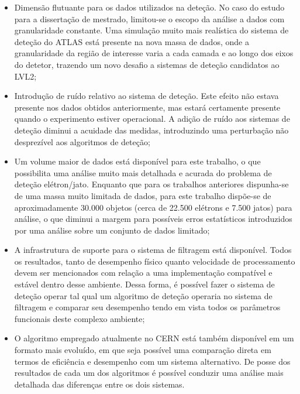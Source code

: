 \begin{itemize}
\item Dimensão flutuante para os dados utilizados na deteção. No caso do
estudo para a dissertação de mestrado, limitou-se o escopo da análise a dados
com granularidade constante. Uma simulação muito mais realística do sistema de
deteção do ATLAS está presente na nova massa de dados, onde a granularidade da
região de interesse varia a cada camada e ao longo dos eixos do detetor,
trazendo um novo desafio a sistemas de deteção candidatos ao LVL2;

\item Introdução de ruído relativo ao sistema de deteção. Este efeito não
estava presente nos dados obtidos anteriormente, mas estará certamente
presente quando o experimento estiver operacional. A adição de ruído aos
sistemas de deteção diminui a acuidade das medidas, introduzindo uma
perturbação não desprezível aos algoritmos de deteção;

\item Um volume maior de dados está disponível para este trabalho, o que
possibilita uma análise muito mais detalhada e acurada do problema de deteção
elétron/jato. Enquanto que para os trabalhos anteriores dispunha-se de uma
massa muito limitada de dados, para este trabalho dispõe-se de aproximadamente
30.000 objetos (cerca de 22.500 elétrons e 7.500 jatos) para análise, o que
diminui a margem para possíveis erros estatísticos introduzidos por uma
análise sobre um conjunto de dados limitado;

\item A infrastrutura de suporte para o sistema de filtragem está
disponível. Todos os resultados, tanto de desempenho físico quanto velocidade
de processamento devem ser mencionados com relação a uma implementação
compatível e estável dentro desse ambiente. Dessa forma, é possível fazer o
sistema de deteção operar tal qual um algoritmo de deteção operaria no sistema
de filtragem e comparar seu desempenho tendo em vista todos os parâmetros
funcionais deste complexo ambiente;

\item O algoritmo empregado atualmente no CERN está também disponível em um
formato mais evoluído, em que seja possível uma comparação direta em termos de
eficiência e desempenho com um sistema alternativo. De posse dos resultados de
cada um dos algoritmos é possível conduzir uma análise mais detalhada das
diferenças entre os dois sistemas.
\end{itemize}

